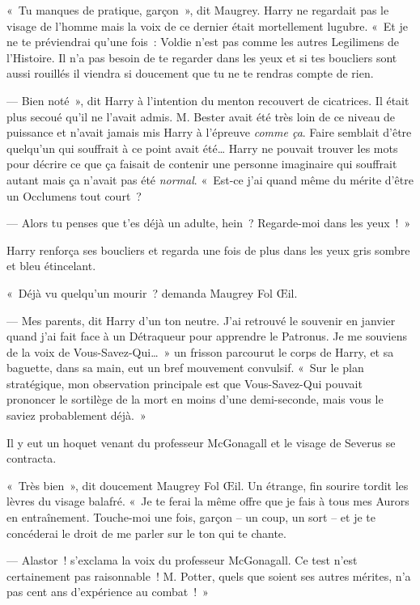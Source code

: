 «~Tu manques de pratique, garçon~», dit Maugrey. Harry ne regardait pas le visage de l'homme mais la voix de ce dernier était mortellement lugubre. «~Et je ne te préviendrai qu'une fois~: Voldie n'est pas comme les autres Legilimens de l'Histoire. Il n'a pas besoin de te regarder dans les yeux et si tes boucliers sont aussi rouillés il viendra si doucement que tu ne te rendras compte de rien.

--- Bien noté~», dit Harry à l'intention du menton recouvert de cicatrices. Il était plus secoué qu'il ne l'avait admis. M. Bester avait été très loin de ce niveau de puissance et n'avait jamais mis Harry à l'épreuve \emph{comme ça}. Faire semblait d'être quelqu'un qui souffrait à ce point avait été… Harry ne pouvait trouver les mots pour décrire ce que ça faisait de contenir une personne imaginaire qui souffrait autant mais ça n'avait pas été \emph{normal}. «~Est-ce j'ai quand même du mérite d'être un Occlumens tout court~?

--- Alors tu penses que t'es déjà un adulte, hein~? Regarde-moi dans les yeux~!~»

Harry renforça ses boucliers et regarda une fois de plus dans les yeux gris sombre et bleu étincelant.

«~Déjà vu quelqu'un mourir~? demanda Maugrey Fol Œil.

--- Mes parents, dit Harry d'un ton neutre. J'ai retrouvé le souvenir en janvier quand j'ai fait face à un Détraqueur pour apprendre le Patronus. Je me souviens de la voix de Vous-Savez-Qui…~» un frisson parcourut le corps de Harry, et sa baguette, dans sa main, eut un bref mouvement convulsif. «~Sur le plan stratégique, mon observation principale est que Vous-Savez-Qui pouvait prononcer le sortilège de la mort en moins d'une demi-seconde, mais vous le saviez probablement déjà.~»

Il y eut un hoquet venant du professeur McGonagall et le visage de Severus se contracta.

«~Très bien~», dit doucement Maugrey Fol Œil. Un étrange, fin sourire tordit les lèvres du visage balafré. «~Je te ferai la même offre que je fais à tous mes Aurors en entraînement. Touche-moi une fois, garçon -- un coup, un sort -- et je te concéderai le droit de me parler sur le ton qui te chante.

--- Alastor~! s'exclama la voix du professeur McGonagall. Ce test n'est certainement pas raisonnable~! M. Potter, quels que soient ses autres mérites, n'a pas cent ans d'expérience au combat~!~»

